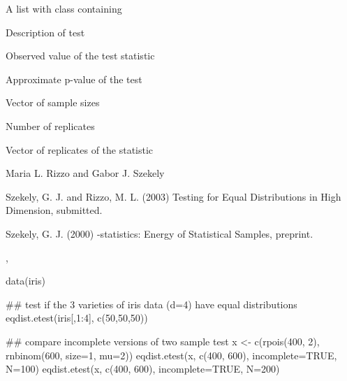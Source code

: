 \begin{Value}
A list with class  containing
\begin{ldescription}
\item[\code{method}] Description of test
\item[\code{statistic}] Observed value of the test statistic
\item[\code{p.value}] Approximate p-value of the test
\item[\code{sizes}] Vector of sample sizes
\item[\code{R}] Number of replicates
\item[\code{replicates}] Vector of replicates of the statistic
\end{ldescription}
\end{Value}
\begin{Author}\relax
Maria L. Rizzo  and
Gabor J. Szekely 
\end{Author}
\begin{References}\relax
Szekely, G. J. and Rizzo, M. L. (2003) Testing for Equal
Distributions in High Dimension, submitted.

Szekely, G. J. (2000) -statistics: Energy of 
Statistical Samples, preprint.\end{References}
\begin{SeeAlso}\relax
{},
\end{SeeAlso}
\begin{Examples}
\begin{ExampleCode}
 data(iris)
 
 ## test if the 3 varieties of iris data (d=4) have equal distributions
 eqdist.etest(iris[,1:4], c(50,50,50))

 ## compare incomplete versions of two sample test
 x <- c(rpois(400, 2), rnbinom(600, size=1, mu=2))
 eqdist.etest(x, c(400, 600), incomplete=TRUE, N=100)
 eqdist.etest(x, c(400, 600), incomplete=TRUE, N=200)
  

\end{ExampleCode}
\end{Examples}

